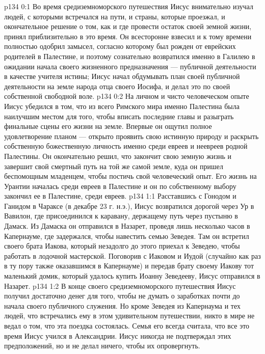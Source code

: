 \vs p134 0:1 Во время средиземноморского путешествия Иисус внимательно изучал людей, с которыми встречался на пути, и страны, которые проезжал, и окончательное решение о том, как и где провести остаток своей земной жизни, принял приблизительно в это время. Он всесторонне взвесил и к тому времени полностью одобрил замысел, согласно которому был рожден от еврейских родителей в Палестине, и поэтому сознательно возвратился именно в Галилею в ожидании начала своего жизненного предназначения --- публичной деятельности в качестве учителя истины; Иисус начал обдумывать план своей публичной деятельности на земле народа отца своего Иосифа, и делал это по своей собственной свободной воле.
\vs p134 0:2 На личном и чисто человеческом опыте Иисус убедился в том, что из всего Римского мира именно Палестина была наилучшим местом для того, чтобы вписать последние главы и разыграть финальные сцены его жизни на земле. Впервые он ощутил полное удовлетворение планом --- открыто проявить свою истинную природу и раскрыть собственную божественную личность именно среди евреев и неевреев родной Палестины. Он окончательно решил, что закончит свою земную жизнь и завершит свой смертный путь на той же самой земле, куда он пришел беспомощным младенцем, чтобы постичь свой человеческий опыт. Его жизнь на Урантии началась среди евреев в Палестине и он по собственному выбору закончил ее в Палестине, среди евреев.
\vs p134 1:1 Расставшись с Гонодом и Ганидом в Чараксе (в декабре 23 г. н.э.), Иисус возвратился дорогой через Ур в Вавилон, где присоединился к каравану, держащему путь через пустыню в Дамаск. Из Дамаска он отправился в Назарет, проведя лишь несколько часов в Капернауме, где задержался, чтобы навестить семью Зеведея. Там он встретил своего брата Иакова, который незадолго до этого приехал к Зеведею, чтобы работать в лодочной мастерской. Поговорив с Иаковом и Иудой (случайно как раз в ту пору также оказавшимся в Капернауме) и передав брату своему Иакову тот маленький домик, который удалось купить Иоанну Зеведееву, Иисус отправился в Назарет.
\vs p134 1:2 В конце своего средиземноморского путешествия Иисус получил достаточно денег для того, чтобы не думать о заработках почти до начала своего публичного служения. Но кроме Зеведея из Капернаума и тех людей, что встречались ему в этом удивительном путешествии, никто в мире не ведал о том, что эта поездка состоялась. Семья его всегда считала, что все это время Иисус учился в Александрии. Иисус никогда не подтверждал этих предположений, но и не делал ничего, чтобы их опровергнуть.
